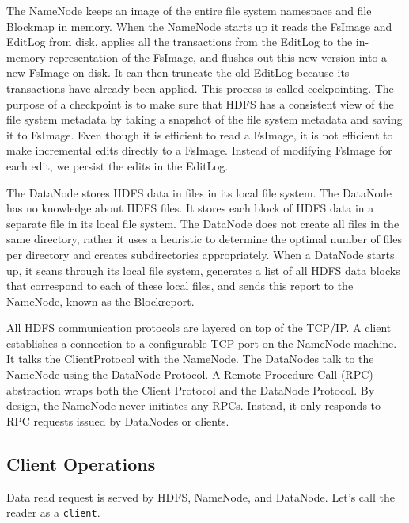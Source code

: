 \documentclass{article}
\begin{document}
The NameNode keeps an image of the entire file system namespace and file Blockmap in memory. When the NameNode starts up it reads the FsImage and EditLog from disk, applies all the transactions from the EditLog to the in-memory representation of the FsImage, and flushes out this new version into a new FsImage on disk. It can then truncate the old EditLog because its transactions have already been applied. This process is called ceckpointing. The purpose of a checkpoint is to make sure that HDFS has a consistent view of the file system metadata by taking a snapshot of the file system metadata and saving it to FsImage. Even though it is efficient to read a FsImage, it is not efficient to make incremental edits directly to a FsImage. Instead of modifying FsImage for each edit, we persist the edits in the EditLog.

The DataNode stores HDFS data in files in its local file system. The DataNode has no knowledge about HDFS files. It stores each block of HDFS data in a separate file in its local file system. The DataNode does not create all files in the same directory, rather it uses a heuristic to determine the optimal number of files per directory and creates subdirectories appropriately. When a DataNode starts up, it scans through its local file system, generates a list of all HDFS data blocks that correspond to each of these local files, and sends this report to the NameNode, known as the Blockreport.

All HDFS communication protocols are layered on top of the TCP/IP. A client establishes a connection to a configurable TCP port on the NameNode machine. It talks the ClientProtocol with the NameNode. The DataNodes talk to the NameNode using the DataNode Protocol. A Remote Procedure Call (RPC) abstraction wraps both the Client Protocol and the DataNode Protocol. By design, the NameNode never initiates any RPCs. Instead, it only responds to RPC requests issued by DataNodes or clients.

\subsection{Client Operations}

Data read request is served by HDFS, NameNode, and DataNode. Let's call the reader as a \texttt{client}. 
\end{document}
